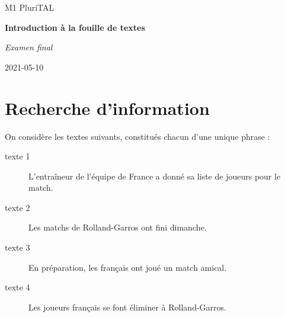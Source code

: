 \documentclass[a4paper, 11pt]{article}
\title{\titlepagetitle}
\author{\myname <\mymail>}
\date{\docdate}
\begin{document}
{
	 \begin{center}
			\large{M1 PluriTAL}\par
			\vspace{1em}
			\huge\textbf{Introduction à la fouille de textes}\par
			\vspace{0.5em}
			\LARGE\textit{Examen final}\par
			\vspace{0.5em}
			\Large{2021-05-10}
	 \end{center}
}

\section{Recherche d'information}

On considère les textes suivants, constitués chacun d'une unique phrase :
\begin{description}
	\item[texte 1] L'entraîneur de l'équipe de France a donné sa liste de joueurs pour le match.
	\item[texte 2] Les matchs de Rolland-Garros ont fini dimanche.
	\item[texte 3] En préparation, les français ont joué un match amical.
	\item[texte 4] Les joueurs français se font éliminer à Rolland-Garros.
\end{description}
\end{document}
